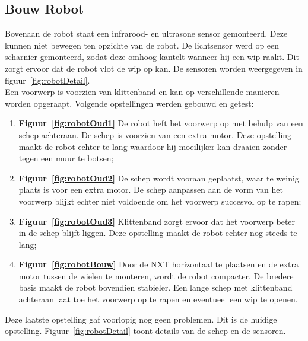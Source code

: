 \documentclass[eind]{penoverslag}
\begin{document}
\subsection{Bouw Robot}
\label{ssec:Bouw}
Bovenaan de robot staat een infrarood- en ultrasone sensor gemonteerd. Deze kunnen niet bewegen ten opzichte van de robot. De lichtsensor werd op een scharnier gemonteerd, zodat deze omhoog kantelt wanneer hij een wip raakt. Dit zorgt ervoor dat de robot vlot de wip op kan. De sensoren worden weergegeven in figuur~\ref{fig:robotDetail}.\\

Een voorwerp is voorzien van klittenband en kan op verschillende manieren worden opgeraapt. Volgende opstellingen werden gebouwd en getest:

\begin{enumerate}
\item \textbf{Figuur~\ref{fig:robotOud1} } De robot heft het voorwerp op met behulp van een schep achteraan. De schep is voorzien van een extra motor. Deze opstelling maakt de robot echter te lang waardoor hij moeilijker kan draaien zonder tegen een muur te botsen;
\item \textbf{Figuur~\ref{fig:robotOud2} } De schep wordt vooraan geplaatst, waar te weinig plaats is voor een extra motor. De schep aanpassen aan de vorm van het voorwerp blijkt echter niet voldoende om het voorwerp succesvol op te rapen;
\item \textbf{Figuur~\ref{fig:robotOud3} } Klittenband zorgt ervoor dat het voorwerp beter in de schep blijft liggen. Deze opstelling maakt de robot echter nog steeds te lang;
\item \textbf{Figuur~\ref{fig:robotBouw} } Door de \textsc{NXT} horizontaal te plaatsen en de extra motor tussen de wielen te monteren, wordt de robot compacter. De bredere basis maakt de robot bovendien stabieler. Een lange schep met klittenband achteraan laat toe het voorwerp op te rapen en eventueel een wip te openen.
\end{enumerate}

Deze laatste opstelling gaf voorlopig nog geen problemen. Dit is de huidige opstelling. Figuur~\ref{fig:robotDetail} toont details van de schep en de sensoren.
\end{document}
